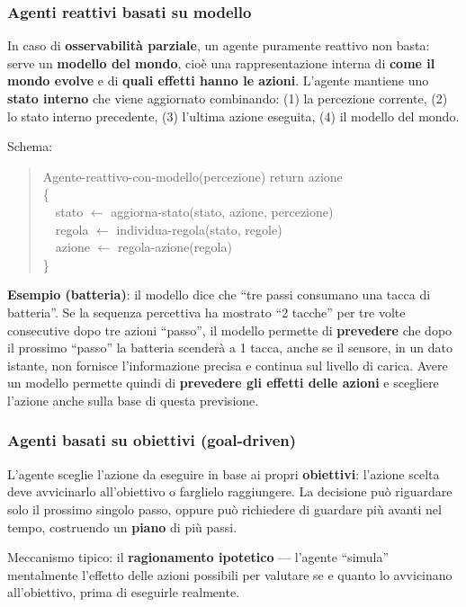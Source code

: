 \documentclass[11pt,a4paper]{report}
\begin{document}
\subsubsection*{Agenti reattivi basati su modello}

In caso di \textbf{osservabilità parziale}, un agente puramente reattivo non basta: serve un \textbf{modello del mondo}, cioè una rappresentazione interna di \textbf{come il mondo evolve} e di \textbf{quali effetti hanno le azioni}. L'agente mantiene uno \textbf{stato interno} che viene aggiornato combinando: (1) la percezione corrente, (2) lo stato interno precedente, (3) l'ultima azione eseguita, (4) il modello del mondo.

Schema:
\begin{quote}
\ttfamily
Agente-reattivo-con-modello(percezione) return azione\\
\{\\
\ \ stato $\leftarrow$ aggiorna-stato(stato, azione, percezione)\\
\ \ regola $\leftarrow$ individua-regola(stato, regole)\\
\ \ azione $\leftarrow$ regola-azione(regola)\\
\}
\end{quote}

\textbf{Esempio (batteria)}: il modello dice che ``tre passi consumano una tacca di batteria''. Se la sequenza percettiva ha mostrato ``2 tacche'' per tre volte consecutive dopo tre azioni ``passo'', il modello permette di \textbf{prevedere} che dopo il prossimo ``passo'' la batteria scenderà a 1 tacca, anche se il sensore, in un dato istante, non fornisce l'informazione precisa e continua sul livello di carica. Avere un modello permette quindi di \textbf{prevedere gli effetti delle azioni} e scegliere l'azione anche sulla base di questa previsione.

\subsubsection*{Agenti basati su obiettivi (goal-driven)}

L'agente sceglie l'azione da eseguire in base ai propri \textbf{obiettivi}: l'azione scelta deve avvicinarlo all'obiettivo o farglielo raggiungere. La decisione può riguardare solo il prossimo singolo passo, oppure può richiedere di guardare più avanti nel tempo, costruendo un \textbf{piano} di più passi.

Meccanismo tipico: il \textbf{ragionamento ipotetico} --- l'agente ``simula'' mentalmente l'effetto delle azioni possibili per valutare se e quanto lo avvicinano all'obiettivo, prima di eseguirle realmente.
\end{document}
